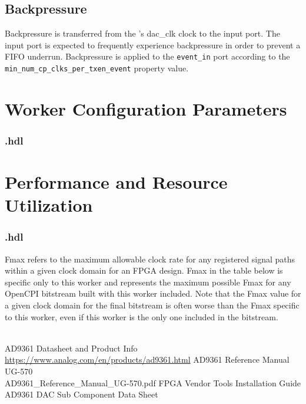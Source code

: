 \subsection*{Backpressure}
Backpressure is transferred from the \devsignal{}'s dac\_clk clock to the input port. The input port is expected to frequently experience backpressure in order to prevent a FIFO underrun. Backpressure is applied to the \verb+event_in+ port according to the \verb+min_num_cp_clks_per_txen_event+ property value.

\section*{Worker Configuration Parameters}
\subsubsection*{\comp.hdl}
%
\section*{Performance and Resource Utilization}
\subsubsection*{\comp.hdl}
Fmax refers to the maximum allowable clock rate for any registered signal paths within a given clock domain for an FPGA design. Fmax in the table below is specific only to this worker and represents the maximum possible Fmax for any OpenCPI bitstream built with this worker included. Note that the Fmax value for a given clock domain for the final bitstream is often worse than the Fmax specific to this worker, even if this worker is the only one included in the bitstream. \\ \\

%



\pagebreak
\begin{thebibliography}{1}

 AD9361 Datasheet and Product Info \\
\url{https://www.analog.com/en/products/ad9361.html}
 AD9361 Reference Manual UG-570\\
AD9361\_Reference\_Manual\_UG-570.pdf
 FPGA Vendor Tools Installation Guide \\
 AD9361 DAC Sub Component Data Sheet \\

\end{thebibliography}
\pagebreak
